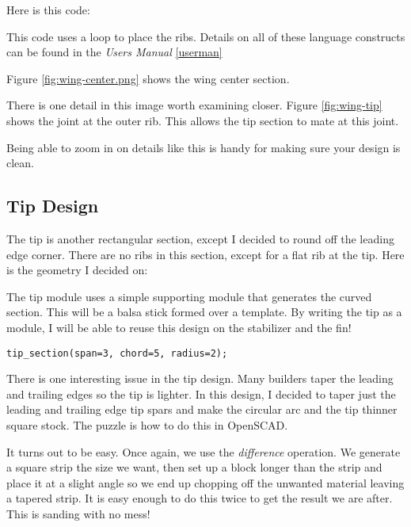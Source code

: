 Here is this code:


This code uses a loop to place the ribs. Details on all of these language
constructs can be found in the {\it Users Manual} \ref{userman}

Figure \ref{fig:wing-center.png} shows the wing center section.


There is one detail in this image worth examining closer. Figure
\ref{fig:wing-tip} shows the joint at the outer rib. This allows the tip section
to mate at this joint.


Being able to zoom in on details like this is handy for making sure your design
is clean.

\subsection*{Tip Design}

The tip is another rectangular section, except I decided to round off the
leading edge corner. There are no ribs in this section, except for a flat rib
at the tip. Here is the geometry I decided on:


The tip module uses a simple supporting module that generates the curved section.
This will be a balsa stick formed over a template.  By writing the tip as a
module, I will be able to reuse this design on the stabilizer and the fin!

\begin{lstlisting}
tip_section(span=3, chord=5, radius=2);
\end{lstlisting}

There is one interesting issue in the tip design. Many builders taper the
leading and trailing edges so the tip is lighter. In this design, I decided to
taper just the leading and trailing edge tip spars and make the circular arc
and the tip thinner square stock. The puzzle is how to do this in OpenSCAD.

It turns out to be easy. Once again, we use the {\it difference} operation. We
generate a square strip the size we want, then set up a block longer than the
strip and place it at a slight angle so we end up chopping off the unwanted
material leaving a tapered strip. It is easy enough to do this twice to get the
result we are after. This is sanding with no mess!

